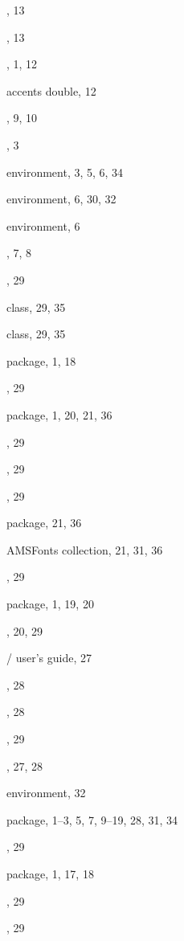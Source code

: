 \documentclass[leqno,titlepage,openany]{amsldoc}
\begin{document}
\begin{theindex}
  \item {}, 13
  \item {}, 13
  \item {}, 1, 12
  \item accents
    \subitem double, 12
  \item {}, 9, 10
  \item {}, 3
  \item {} environment, 3, 5, 6, 34
  \item {} environment, 6, 30, 32
  \item {} environment, 6
  \item {}, 7, 8
  \item {}, 29
  \item {} class, 29, 35
  \item {} class, 29, 35
  \item {} package, 1, 18
  \item {}, 29
  \item {} package, 1, 20, 21, 36
  \item {}, 29
  \item {}, 29
  \item {}, 29
  \item {} package, 21, 36
  \item AMSFonts collection, 21, 31, 36
  \item {}, 29
  \item {} package, 1, 19, 20
  \item {}, 20, 29
  \item \amslatex/ user's guide, 27
  \item {}, 28
  \item {}, 28
  \item {}, 29
  \item {}, 27, 28
  \item {} environment, 32
  \item {} package, 1--3, 5, 7, 9--19, 28, 31, 34
  \item {}, 29
  \item {} package, 1, 17, 18
  \item {}, 29
  \item {}, 29

\end{theindex}
\end{document}
